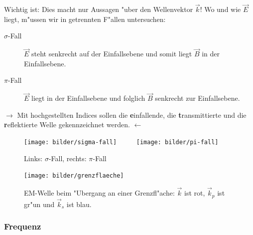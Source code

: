 \documentclass[twoside,a4paper]{book}
\newenvironment*{Einschub}[0]{$\rightarrow$ \indent}{$\leftarrow$}
\begin{document}
Wichtig ist: Dies macht nur Aussagen "uber den Wellenvektor $\vec k$!
Wo und wie $\vec E$ liegt, m"ussen wir in getrennten F"allen
untersuchen: 
\begin{description}
\item[$\sigma$-Fall] $\vec E$ steht senkrecht auf der Einfallsebene
   und somit liegt $\vec B$ in der Einfallsebene.
\item[$\pi$-Fall] $\vec E$ liegt in der Einfallsebene und folglich
   $\vec B$ senkrecht zur Einfallsebene.
\end{description}

\begin{Einschub}
   Mit hochgestellten Indices sollen die \textbf{e}infallende, die
   \textbf{t}ransmittierte und die \textbf{r}eflektierte Welle
   gekennzeichnet werden.
\end{Einschub}



\begin{figure}[h]
   \centering
   \texttt{[image: bilder/sigma-fall]} ~  ~  ~ %
   \texttt{[image: bilder/pi-fall]}
   \caption[$\sigma$- und $\pi$-Fall]{Links: $\sigma$-Fall, rechts: $\pi$-Fall}
   \label{fig_sigma-pi-fall}
\end{figure}



\begin{figure}
   \centering
   \texttt{[image: bilder/grenzflaeche]}
   \caption[Welle beim "Ubergang]{EM-Welle beim "Ubergang an einer Grenzfl"ache: $\vec k$ ist rot, $\vec k_p$ ist gr"un und $\vec k_s$ ist blau.}
   \label{abb_grenzflaechenuebergang}
\end{figure}





\subsubsection{Frequenz}
\label{kap_frequenz}
\end{document}
